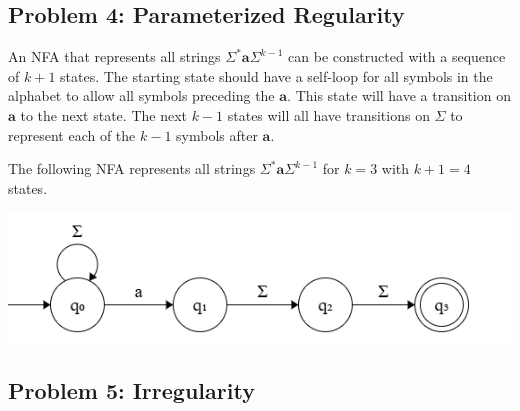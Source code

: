 \documentclass{article}
\begin{document}
\subsection*{Problem 4: Parameterized Regularity}

An NFA that represents all strings $\Sigma^*\mathbf{a}\Sigma^{k-1}$ can be constructed with a sequence of $k+1$ states. The starting state should have a self-loop for all symbols in the alphabet to allow all symbols preceding the $\mathbf{a}$. This state will have a transition on $\mathbf{a}$ to the next state. The next $k-1$ states will all have transitions on $\Sigma$ to represent each of the $k-1$ symbols after $\mathbf{a}$.
\vspace{1em}

The following NFA represents all strings $\Sigma^*\mathbf{a}\Sigma^{k-1}$ for $k=3$ with $k+1=4$ states.

\begin{center}
    \includegraphics[scale=0.65]{nfa2.png}
\end{center}

\pagebreak
\subsection*{Problem 5: Irregularity}
\end{document}
